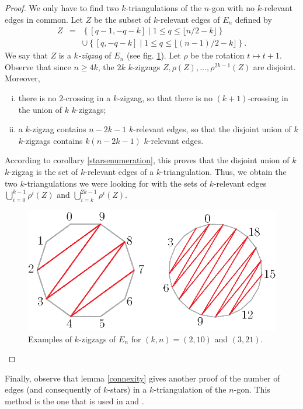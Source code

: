 \documentclass[12pt]{amsart}
\begin{document}
\begin{proof}
We only have to find two $k$-triangulations of the $n$-gon with no $k$-relevant edges in common. Let $Z$ be the subset of $k$-relevant edges of $E_n$ defined by
\begin{eqnarray*}
Z & = & \left\{[q-1,-q-k]\;|\; 1\le q\le \lfloor n/2-k\rfloor\right\}\\
&&\cup\left\{[q,-q-k]\;|\; 1\le q\le \lfloor (n-1)/2-k\rfloor\right\}.
\end{eqnarray*}
We say that $Z$ is a \emph{$k$-zigzag} of $E_n$ (see fig. \ref{zigzags}). Let $\rho$ be the rotation $t\mapsto t+1$. Observe that since $n\ge 4k$, the $2k$ $k$-zigzags $Z,\rho(Z),\ldots,\rho^{2k-1}(Z)$ are disjoint. Moreover,
\begin{enumerate}[(i)]
\item there is no $2$-crossing in a $k$-zigzag, so that there is no $(k+1)$-crossing in the union of $k$ $k$-zigzags;
\item a $k$-zigzag contains $n-2k-1$ $k$-relevant edges, so that the disjoint union of $k$ $k$-zigzags contains $k(n-2k-1)$ $k$-relevant edges.
\end{enumerate}
According to corollary \ref{starsenumeration}, this proves that the disjoint union of $k$ $k$-zigzag is the set of $k$-relevant edges of a $k$-triangulation. Thus, we obtain the two $k$-triangulations we were looking for with the sets of $k$-relevant edges $\bigcup_{i=0}^{k-1} \rho^i(Z)$ and $\bigcup_{i=k}^{2k-1} \rho^i(Z)$.
\begin{figure}
\centerline{\includegraphics[scale=1]{zigzags.eps}}
\caption{\small{Examples of $k$-zigzags of $E_n$ for $(k,n)=(2,10)$ and $(3,21)$.}}\label{zigzags}
\end{figure}
\end{proof}

Finally, observe that lemma \ref{connexity} gives another proof of the number of edges (and consequently of $k$-stars) in a $k$-triangulation of the $n$-gon. This method is the one that is used in \cite{n-gdfcp-00} and \cite{dkm-lahp-02}.
\end{document}
